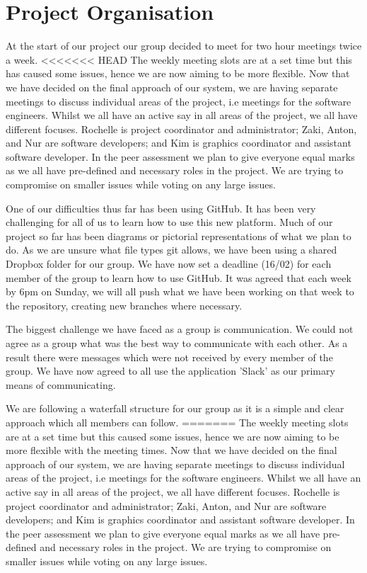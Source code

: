 \documentclass[11pt]{article}
\begin{document}
	\section{Project Organisation}
		At the start of our project our group decided to meet for two hour meetings twice a week. 
<<<<<<< HEAD
		The weekly meeting slots are at a set time but this has caused some issues, hence we are now aiming to be more flexible. 
		Now that we have decided on the final approach of our system, we are having separate meetings to discuss individual areas of the project, i.e meetings for the software engineers. 
		Whilst we all have an active say in all areas of the project, we all have different focuses. Rochelle is project coordinator and administrator; Zaki, Anton, and Nur are software developers; and Kim is graphics coordinator and assistant software developer. 
		In the peer assessment we plan to give everyone equal marks as we all have pre-defined and necessary roles in the project. 
		We are trying to compromise on smaller issues while voting on any large issues. 
		 
		One of our difficulties thus far has been using GitHub. 
		It has been very challenging for all of us to learn how to use this new platform.  
		Much of our project so far has been diagrams or pictorial representations of what we plan to do. 
		As we are unsure what file types git allows, we have been using a shared Dropbox folder for our group. 
		We have now set a deadline (16/02) for each member of the group to learn how to use GitHub. 
		It was agreed that each week by 6pm on Sunday, we will all push what we have been working on that week to the repository, creating new branches where necessary. 
		
		The biggest challenge we have faced as a group is communication. 
		We could not agree as a group what was the best way to communicate with each other. 
		As a result there were messages which were not received by every member of the group. 
		We have now agreed to all use the application 'Slack' as our primary means of communicating. 
		
		We are following a waterfall structure for our group as it is a simple and clear approach which all members can follow. 
=======
		The weekly meeting slots are at a set time but this caused some issues, hence we are now aiming to be more flexible with the meeting times. 
		Now that we have decided on the final approach of our system, we are having separate meetings to discuss individual areas of the project, i.e meetings for the software engineers. 
		Whilst we all have an active say in all areas of the project, we all have different focuses. 
		Rochelle is project coordinator and administrator; Zaki, Anton, and Nur are software developers; and Kim is graphics coordinator and assistant software developer. 
		In the peer assessment we plan to give everyone equal marks as we all have pre-defined and necessary roles in the project. 
		We are trying to compromise on smaller issues while voting on any large issues. 
		 
\end{document}
